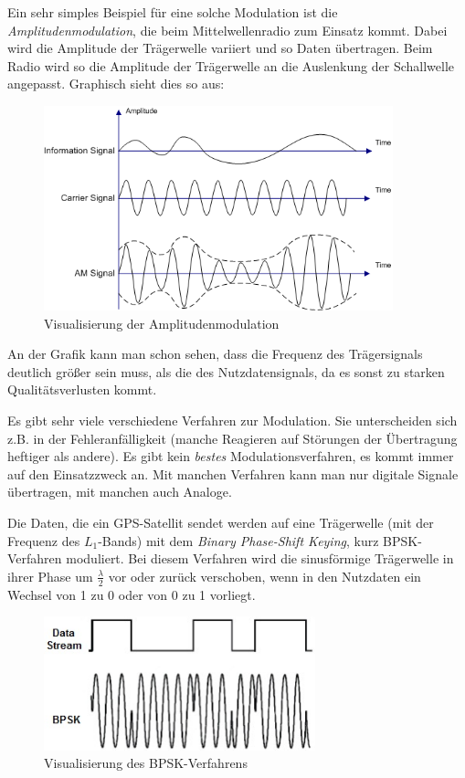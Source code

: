 \documentclass[12pt,a4paper]{scrartcl}
\begin{document}
Ein sehr simples Beispiel für eine solche Modulation ist die \emph{Amplitudenmodulation}, die beim Mittelwellenradio zum Einsatz kommt. Dabei wird die Amplitude der Trägerwelle variiert und so Daten übertragen. Beim Radio wird so die Amplitude der Trägerwelle an die Auslenkung der Schallwelle angepasst. Graphisch sieht dies so aus:

\begin{figure}[H]
\centering
\includegraphics[width=0.9\textwidth]{img/Illustration_of_Amplitude_Modulation.png}
\caption{Visualisierung der Amplitudenmodulation\cite{commons_am}}
\label{fig:am}
\end{figure}

An der Grafik kann man schon sehen, dass die Frequenz des Trägersignals deutlich größer sein muss, als die des Nutzdatensignals, da es sonst zu starken Qualitätsverlusten kommt.

Es gibt sehr viele verschiedene Verfahren zur Modulation. Sie unterscheiden sich z.B. in der Fehleranfälligkeit (manche Reagieren auf Störungen der Übertragung heftiger als andere). Es gibt kein \emph{bestes} Modulationsverfahren, es kommt immer auf den Einsatzzweck an. Mit manchen Verfahren kann man nur digitale Signale übertragen, mit manchen auch Analoge.

Die Daten, die ein GPS-Satellit sendet werden auf eine Trägerwelle (mit der Frequenz des $L_1$-Bands) mit dem \emph{Binary Phase-Shift Keying}, kurz BPSK-Verfahren moduliert.
Bei diesem Verfahren wird die sinusförmige Trägerwelle in ihrer Phase um $\frac{\lambda}{2}$ vor oder zurück verschoben, wenn in den Nutzdaten ein Wechsel von 1 zu 0 oder von 0 zu 1 vorliegt.

\begin{figure}[H]
\centering
\includegraphics[width=0.7\textwidth]{img/bpsk.jpg}
\caption{Visualisierung des BPSK-Verfahrens\cite{evalidate_bpsk}}
\label{fig:bpsk}
\end{figure}
\end{document}
